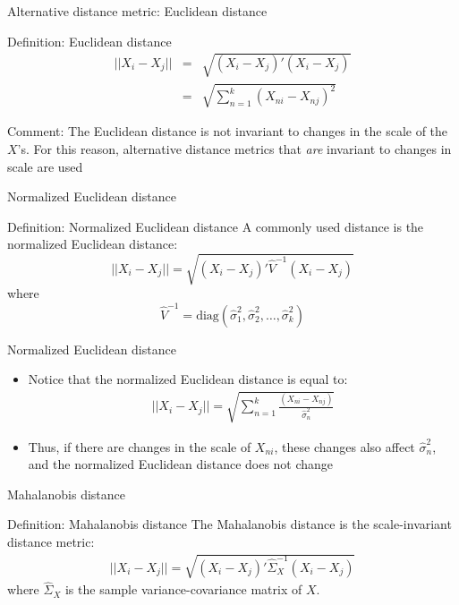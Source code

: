 \documentclass{beamer}
\begin{document}
\begin{frame}{Alternative distance metric: Euclidean distance}
	\begin{block}{Definition: Euclidean distance}
    \vspace*{-2.5mm}
    \begin{eqnarray*}
    ||X_i-X_j|| &=& \sqrt{ (X_i-X_j)'(X_i-X_j) } \\
    &=& \sqrt{ \sum_{n=1}^k (X_{ni} - X_{nj})^2 }
    \end{eqnarray*}
    \vspace*{-2.5mm}
	\end{block}
	
  \textcolor{picton-blue}{Comment}: The Euclidean distance is not invariant to changes in the scale of the $X$'s.  For this reason, alternative distance metrics that \emph{are} invariant to changes in scale are used
	
\end{frame}


\begin{frame}{Normalized Euclidean distance}

	\begin{block}{Definition: Normalized Euclidean distance}
	  A commonly used distance is the normalized Euclidean distance:$$||X_i-X_j|| = \sqrt{ (X_i-X_j)'\widehat{V}^{-1}(X_i - X_j) }$$ where
		$$\widehat{V}^{-1} = \text{diag}(\widehat{\sigma}_1^2, \widehat{\sigma}_2^2, \dots, \widehat{\sigma}_k^2)$$
	\end{block}
\end{frame}

\begin{frame}{Normalized Euclidean distance}
	\begin{itemize}
	\item Notice that the normalized Euclidean distance is equal to:
		\begin{eqnarray*}
		||X_i - X_j|| = \sqrt{\sum_{n=1}^k \frac{(X_{ni} - X_{nj})}{\widehat{\sigma}^2_n}}
		\end{eqnarray*}
	\item Thus, if there are changes in the scale of $X_{ni}$, these changes also affect $\widehat{\sigma}^2_n$, and the normalized Euclidean distance does not change
	\end{itemize}

\end{frame}


\begin{frame}{Mahalanobis distance}
	
	\begin{block}{Definition: Mahalanobis distance}
	The Mahalanobis distance is the scale-invariant distance metric:
		\begin{eqnarray*}
		||X_i-X_j|| = \sqrt{ (X_i-X_j)'\widehat{\Sigma}_X^{-1}(X_i - X_j) }
		\end{eqnarray*}
	where $\widehat{\Sigma}_X$ is the sample variance-covariance matrix of $X$.
	\end{block}


\end{frame}
\end{document}
